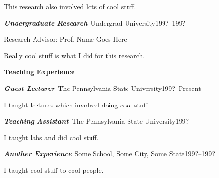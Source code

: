 \documentclass[11pt]{psuthesis}
\begin{document}
\begin{singlespace}
\par\noindent
\hspace{0.10truein}  
\parbox{5.7truein}{
\par\noindent
This research also involved lots of cool stuff.
}

\medskip

\par\noindent
\textbf{\textit{Undergraduate Research}}\, Undergrad University\hfill 199?--199?
\par\noindent
Research Advisor: Prof. Name Goes Here

\smallskip

\par\noindent
\hspace{0.10truein}  
\parbox{5.7truein}{
\par\noindent
Really cool stuff is what I did for this research.
}

\medskip

\large
\centerline{{\bf Teaching Experience}}
\normalsize

\smallskip

\par\noindent
\textbf{\textit{Guest Lecturer}}\, The Pennsylvania State University\hfill 199?--Present

\smallskip

\par\noindent
\hspace{0.10truein}  
\parbox{5.7truein}{
\par\noindent
I taught lectures which involved doing cool stuff.
}

\medskip

\par\noindent
\textbf{\textit{Teaching Assistant}}\, The Pennsylvania State University\hfill 199?

\smallskip

\par\noindent
\hspace{0.10truein}  
\parbox{5.7truein}{
\par\noindent
I taught labs and did cool stuff.
}

\medskip

\par\noindent
\textbf{\textit{Another Experience}}\, Some School, Some City, Some State\hfill 199?--199?

\smallskip

\par\noindent
\hspace{0.10truein}  
\parbox{5.7truein}{
\par\noindent
I taught cool stuff to cool people.
}

\end{singlespace}
\end{document}
